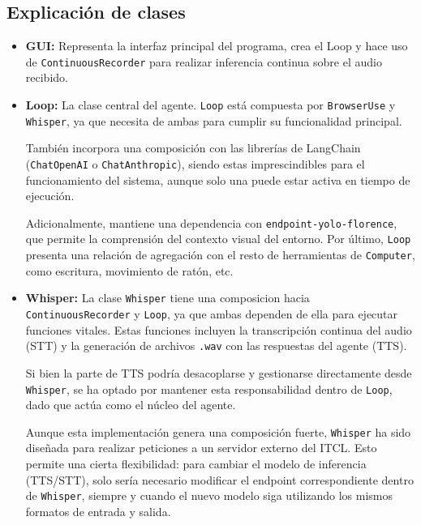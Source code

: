 \subsection{Explicación de clases}
\begin{itemize}

    \item \textbf{GUI:} Representa la interfaz principal del programa, crea el Loop y hace uso de \texttt{ContinuousRecorder} para realizar inferencia continua sobre el audio recibido.

    \item \textbf{Loop:} La clase central del agente. \texttt{Loop} está compuesta por \texttt{BrowserUse} y \texttt{Whisper}, ya que necesita de ambas para cumplir su funcionalidad principal. 
    
    También incorpora una composición con las librerías de LangChain (\texttt{ChatOpenAI} o \texttt{ChatAnthropic}), siendo estas imprescindibles para el funcionamiento del sistema, aunque solo una puede estar activa en tiempo de ejecución.
    
    Adicionalmente, mantiene una dependencia con \texttt{endpoint-yolo-florence}, que permite la comprensión del contexto visual del entorno. Por último, \texttt{Loop} presenta una relación de agregación con el resto de herramientas de \texttt{Computer}, como escritura, movimiento de ratón, etc.

    \item \textbf{Whisper:} La clase \texttt{Whisper} tiene una composicion hacia \texttt{ContinuousRecorder} y \texttt{Loop}, ya que ambas dependen de ella para ejecutar funciones vitales. Estas funciones incluyen la transcripción continua del audio (STT) y la generación de archivos \texttt{.wav} con las respuestas del agente (TTS).
    
    Si bien la parte de TTS podría desacoplarse y gestionarse directamente desde \texttt{Whisper}, se ha optado por mantener esta responsabilidad dentro de \texttt{Loop}, dado que actúa como el núcleo del agente.
    
    Aunque esta implementación genera una composición fuerte, \texttt{Whisper} ha sido diseñada para realizar peticiones a un servidor externo del ITCL. Esto permite una cierta flexibilidad: para cambiar el modelo de inferencia (TTS/STT), solo sería necesario modificar el endpoint correspondiente dentro de \texttt{Whisper}, siempre y cuando el nuevo modelo siga utilizando los mismos formatos de entrada y salida.
    

\end{itemize}
